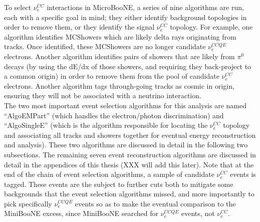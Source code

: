 To select $\nu_e^{CC}$ interactions in MicroBooNE, a series of nine algorithms are run, each with a specific goal in mind; they either identify background topologies in order to remove them, or they identify the signal $\nu_e^{CC}$ topology. For example, one algorithm identifies {\sc MCShowers} which are likely delta rays originating from tracks. Once identified, these {\sc MCShowers} are no longer candidate $\nu_e^{CCQE}$ electrons. Another algorithm identifies pairs of showers that are likely from $\pi^0$ decays (by using the dE/dx of those showers, and requiring they back-project to a common origin) in order to remove them from the pool of candidate $\nu_e^{CC}$ electrons. Another algorithm tags through-going tracks as cosmic in origin, ensuring they will not be associated with a neutrino interaction.\\

The two most important event selection algorithms for this analysis are named ``AlgoEMPart'' (which handles the electron/photon discrimination) and ``AlgoSingleE'' (which is the algorithm responsible for locating the $\nu_e^{CC}$ topology and associating all tracks and showers together for eventual energy reconstruction and analysis). These two algorithms are discussed in detail in the following two subsections. The remaining seven event reconstruction algorithms are discussed in detail in the appendices of this thesis (XXX will add this later). Note that at the end of the chain of event selection algorithms, a sample of candidate $\nu_e^{CC}$ events is tagged. These events are the subject to further cuts both to mitigate some backgrounds that the event selection algorithms missed, and more importantly to pick specifically $\nu_e^{CCQE}$ events so as to make the eventual comparison to the MiniBooNE excess, since MiniBooNE searched for $\nu_e^{CCQE}$ events, not $\nu_e^{CC}$.


